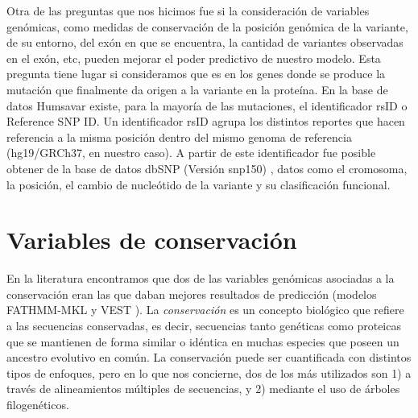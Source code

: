 
Otra de las preguntas que nos hicimos fue si la consideración de variables genómicas, como medidas de conservación de la posición genómica de la variante, de su entorno, del exón en que se encuentra, la cantidad de variantes observadas en el exón, etc, pueden mejorar el poder predictivo de nuestro modelo. Esta pregunta tiene lugar si consideramos que es en los genes donde se produce la mutación que finalmente da origen a la variante en la proteína. En la base de datos Humsavar existe, para la mayoría de las mutaciones, el identificador rsID o Reference SNP ID. Un identificador rsID agrupa los distintos reportes que hacen referencia a la misma posición dentro del mismo genoma de referencia (hg19/GRCh37, en nuestro caso). A partir de este identificador fue posible obtener de la base de datos dbSNP (Versión snp150) \cite{dbSNP}, datos como el cromosoma, la posición, el cambio de nucleótido de la variante y su clasificación funcional.

\section{Variables de conservación}

En la literatura encontramos que dos de las variables genómicas asociadas a la conservación eran las que daban mejores resultados de predicción (modelos FATHMM-MKL \cite{Shihab2015} y VEST \cite{Carter2013}). La \textit{conservación} es un concepto biológico que refiere a las secuencias conservadas, es decir, secuencias tanto genéticas como proteicas que se mantienen de forma similar o idéntica en muchas especies que poseen un ancestro evolutivo en común. La conservación puede ser cuantificada con distintos tipos de enfoques, pero en lo que nos concierne, dos de los más utilizados son 1) a través de alineamientos múltiples de secuencias, y 2) mediante el uso de árboles filogenéticos.

